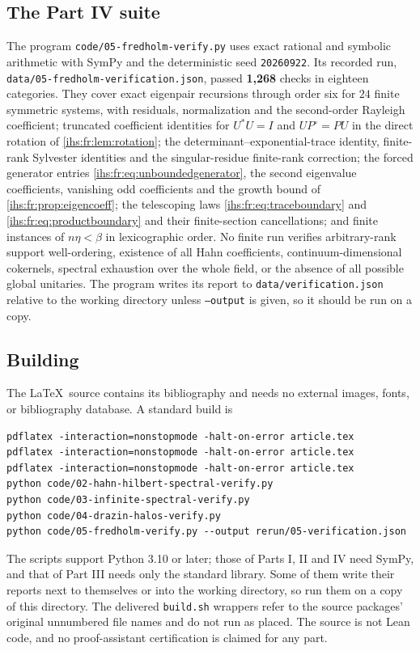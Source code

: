 \documentclass[11pt,a4paper]{article}
\numberwithin{equation}{section}
\theoremstyle{definition}
\theoremstyle{remark}
\begin{document}
\subsection{The Part IV suite}\label{ihs:sec:checksfour}
The program \texttt{code/05-fredholm-verify.py} uses exact rational and
symbolic arithmetic with SymPy and the deterministic seed \texttt{20260922}.
Its recorded run, \nolinkurl{data/05-fredholm-verification.json}, passed
\textbf{1,268} checks in eighteen categories. They cover exact eigenpair
recursions through order six for $24$ finite symmetric systems, with
residuals, normalization and the second-order Rayleigh coefficient; truncated
coefficient identities for $U^*U=I$ and $UP^\circ=PU$ in the direct rotation
of \cref{ihs:fr:lem:rotation}; the determinant--exponential-trace identity,
finite-rank Sylvester identities and the singular-residue finite-rank
correction; the forced generator entries
\eqref{ihs:fr:eq:unboundedgenerator}, the second eigenvalue coefficients,
vanishing odd coefficients and the growth bound of
\cref{ihs:fr:prop:eigencoeff}; the telescoping laws
\eqref{ihs:fr:eq:traceboundary} and \eqref{ihs:fr:eq:productboundary} and
their finite-section cancellations; and finite instances of $n\eta<\beta$ in
lexicographic order. No finite run verifies arbitrary-rank support
well-ordering, existence of all Hahn coefficients, continuum-dimensional
cokernels, spectral exhaustion over the whole field, or the absence of all
possible global unitaries. The program writes its report to
\texttt{data/verification.json} relative to the working directory unless
\texttt{--output} is given, so it should be run on a copy.

\subsection{Building}\label{ihs:sec:building}
The \LaTeX\ source contains its bibliography and needs no external images,
fonts, or bibliography database. A standard build is
\begin{verbatim}
pdflatex -interaction=nonstopmode -halt-on-error article.tex
pdflatex -interaction=nonstopmode -halt-on-error article.tex
pdflatex -interaction=nonstopmode -halt-on-error article.tex
python code/02-hahn-hilbert-spectral-verify.py
python code/03-infinite-spectral-verify.py
python code/04-drazin-halos-verify.py
python code/05-fredholm-verify.py --output rerun/05-verification.json
\end{verbatim}
The scripts support Python 3.10 or later; those of Parts I, II and IV need
SymPy, and that of Part III needs only the standard library. Some of them
write their reports next to themselves or into the working directory, so run
them on a copy of this directory. The delivered \texttt{build.sh} wrappers
refer to the source packages' original unnumbered file names and do not run
as placed. The source is not Lean code, and no proof-assistant certification
is claimed for any part.
\end{document}
